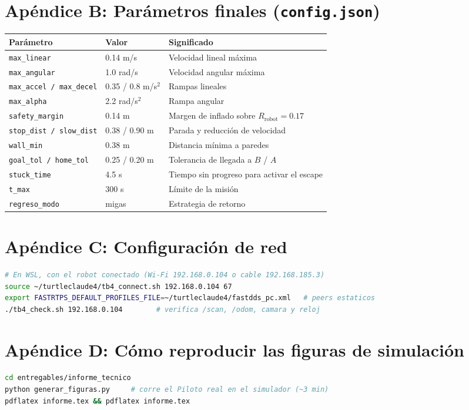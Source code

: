 \documentclass[11pt,a4paper]{article}
\begin{document}
\section{Ap\'endice B: Par\'ametros finales (\texttt{config.json})}
\begin{table}[H]
\centering\small
\begin{tabularx}{\textwidth}{@{}ll>{\raggedright\arraybackslash}X@{}}
\toprule
\textbf{Par\'ametro} & \textbf{Valor} & \textbf{Significado} \\
\midrule
\texttt{max\_linear} & 0.14 m/s & Velocidad lineal m\'axima \\
\texttt{max\_angular} & 1.0 rad/s & Velocidad angular m\'axima \\
\texttt{max\_accel / max\_decel} & 0.35 / 0.8 m/s$^2$ & Rampas lineales \\
\texttt{max\_alpha} & 2.2 rad/s$^2$ & Rampa angular \\
\texttt{safety\_margin} & 0.14 m & Margen de inflado sobre $R_{\text{robot}}=0.17$ \\
\texttt{stop\_dist / slow\_dist} & 0.38 / 0.90 m & Parada y reducci\'on de velocidad \\
\texttt{wall\_min} & 0.38 m & Distancia m\'inima a paredes \\
\texttt{goal\_tol / home\_tol} & 0.25 / 0.20 m & Tolerancia de llegada a $B$ / $A$ \\
\texttt{stuck\_time} & 4.5 s & Tiempo sin progreso para activar el escape \\
\texttt{t\_max} & 300 s & L\'imite de la misi\'on \\
\texttt{regreso\_modo} & migas & Estrategia de retorno \\
\bottomrule
\end{tabularx}
\end{table}

\section{Ap\'endice C: Configuraci\'on de red}
\begin{lstlisting}[language=bash]
# En WSL, con el robot conectado (Wi-Fi 192.168.0.104 o cable 192.168.185.3)
source ~/turtleclaude4/tb4_connect.sh 192.168.0.104 67
export FASTRTPS_DEFAULT_PROFILES_FILE=~/turtleclaude4/fastdds_pc.xml   # peers estaticos
./tb4_check.sh 192.168.0.104        # verifica /scan, /odom, camara y reloj
\end{lstlisting}

\section{Ap\'endice D: C\'omo reproducir las figuras de simulaci\'on}
\begin{lstlisting}[language=bash]
cd entregables/informe_tecnico
python generar_figuras.py     # corre el Piloto real en el simulador (~3 min)
pdflatex informe.tex && pdflatex informe.tex
\end{lstlisting}
\end{document}
